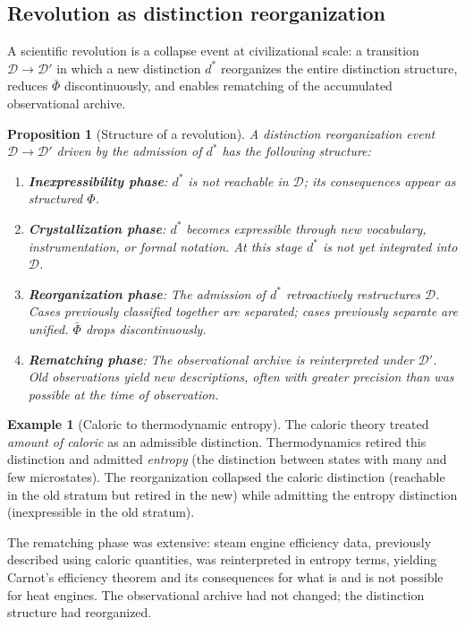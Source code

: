 \documentclass[11pt, a4paper]{article}
\theoremstyle{plain}
\newtheorem{proposition}[theorem]{Proposition}
\theoremstyle{definition}
\newtheorem{example}[theorem]{Example}
\theoremstyle{remark}
\newcommand{\Dist}{\mathcal{D}}
\newcommand{\PhiF}{\varPhi}
\begin{document}
\subsection{Revolution as distinction reorganization}

A scientific revolution is a collapse event at civilizational
scale: a transition $\Dist \to \Dist'$ in which a new distinction
$d^*$ reorganizes the entire distinction structure, reduces
$\bar\PhiF$ discontinuously, and enables rematching of the
accumulated observational archive.

\begin{proposition}[Structure of a revolution]
A distinction reorganization event $\Dist \to \Dist'$ driven by
the admission of $d^*$ has the following structure:
\begin{enumerate}[label=(\roman*)]
  \item \textbf{Inexpressibility phase}: $d^*$ is not reachable
        in $\Dist$; its consequences appear as structured $\PhiF$.
  \item \textbf{Crystallization phase}: $d^*$ becomes expressible
        through new vocabulary, instrumentation, or formal notation.
        At this stage $d^*$ is not yet integrated into $\Dist$.
  \item \textbf{Reorganization phase}: The admission of $d^*$
        retroactively restructures $\Dist$. Cases previously
        classified together are separated; cases previously
        separate are unified.
        $\bar\PhiF$ drops discontinuously.
  \item \textbf{Rematching phase}: The observational archive
        is reinterpreted under $\Dist'$. Old observations yield
        new descriptions, often with greater precision than
        was possible at the time of observation.
\end{enumerate}
\end{proposition}

\begin{example}[Caloric to thermodynamic entropy]
\label{ex:caloric}
The caloric theory treated \emph{amount of caloric} as an admissible
distinction. Thermodynamics retired this distinction and admitted
\emph{entropy} (the distinction between states with many and few
microstates). The reorganization collapsed the caloric distinction
(reachable in the old stratum but retired in the new) while
admitting the entropy distinction (inexpressible in the old stratum).

The rematching phase was extensive: steam engine efficiency data,
previously described using caloric quantities, was reinterpreted
in entropy terms, yielding Carnot's efficiency theorem and its
consequences for what is and is not possible for heat engines.
The observational archive had not changed; the distinction structure
had reorganized.
\end{example}
\end{document}
